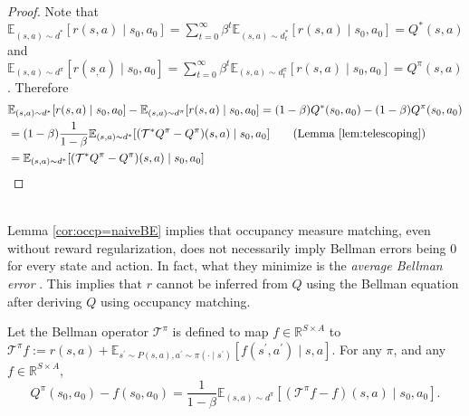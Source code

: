 \begin{proof} 
   Note that $\mathbb{E}_{(s, a) \sim d^{\ast}}[r(s, a)\mid s_0, a_0]=\sum_{t=0}^{\infty} \beta^t \mathbb{E}_{(s,a)\sim d_t^\ast}[r(s,a)\mid s_0,a_0]=Q^\ast(s, a)$ and $\mathbb{E}_{(s, a) \sim d^{\pi}}[r(s_, a)\mid s_0, a_0]=\sum_{t=0}^{\infty} \beta^t \mathbb{E}_{(s,a)\sim d_t^\pi}[r(s,a)\mid s_0,a_0] = Q^\pi(s, a)$. Therefore
   \begin{align}
       &\mathbb{E}_{(s, a) \sim d^\ast}[r(s, a)\mid s_0,a_0]-\mathbb{E}_{(s, a) \sim d^\pi}[r(s, a)\mid s_0,a_0] =(1-\beta)Q^\ast(s_0, a_0)-(1-\beta)Q^\pi(s_0, a_0)\notag
       \\
       &=(1-\beta)\frac{1}{1-\beta} \mathbb{E}_{(s,a)\sim d^{\ast}}[(\mathcal{T}^\ast Q^\pi-Q^\pi)(s,a)\mid s_0, a_0]\tag{Lemma \ref{lem:telescoping}}
       \\
       &= \mathbb{E}_{(s,a)\sim d^{\ast}}[(\mathcal{T}^\ast Q^\pi-Q^\pi)(s,a)\mid s_0, a_0] \notag
   \end{align}
\end{proof}
\;
\\
Lemma \ref{cor:occp=naiveBE} implies that occupancy measure matching, even without reward regularization, does not necessarily imply Bellman errors being 0 for every state and action. In fact, what they minimize is the \textit{average Bellman error} \cite{jiang2017contextual,uehara2020minimax}. This implies that $r$ cannot be inferred from $Q$ using the Bellman equation after deriving $Q$ using occupancy matching. 



\begin{lem}\label{lem:telescoping} 
Let the Bellman operator $\mathcal{T}^\pi$ is defined to map $f\in \mathbb{R}^{S\times A}$ to $\mathcal{T}^\pi f := r(s,a) + \mathbb{E}_{s^\prime\sim P(s,a), a^\prime\sim \pi(\cdot\mid s^\prime)}[f(s^\prime,a^\prime)\mid s,a]$. 
For any $\pi$, and any $f\in \mathbb{R}^{S\times A}$,
$$
Q^\pi(s_0, a_0)-f(s_0, a_0) = \frac{1}{1-\beta} \mathbb{E}_{(s,a)\sim d^\pi}[(\mathcal{T}^\pi f-f)(s,a)\mid s_0, a_0].
$$

\end{lem}

